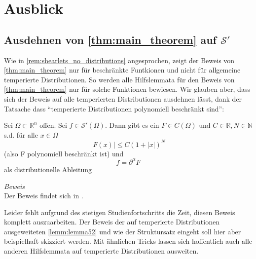 
\section{Ausblick} %
\label{sec:ausblick}

\subsection{\texorpdfstring{Ausdehnen von \cref{thm:main_theorem} auf $\mathcal{S}'$}{Ausdehnen auf Distributionen}} %
\label{sec:ausdehnen_von_thm:main_theorem}
Wie in \cref{rem:shearlets_no_distributions} angesprochen, zeigt der Beweis von \textcite{Kutyniok2008} \cref{thm:main_theorem} nur für beschränkte Funtkionen und nicht für allgemeine temperierte Distributionen. So werden alle Hilfslemmata für den Beweis von \cref{thm:main_theorem} nur für solche Funktionen bewiesen. Wir glauben aber, dass sich der Beweis auf alle temperierten Distributionen ausdehnen lässt, dank der Tatsache dass "`temperierte Distributionen polynomiell beschränkt sind"':

\begin{theorem}
\label{thm:struktursatz}
    Sei $\Omega \subset \mathbb{R}^n$ offen. Sei $f \in \mathcal{S}'(\Omega)$. Dann gibt es ein $F \in C(\Omega)$ und $C \in \mathbb{R}, N \in \mathbb{N}$ s.d. für alle $x \in \Omega$
    \begin{equation*}
        |F(x)| \leq C (1+|x| )^N
    \end{equation*}
    (also F polynomiell beschränkt ist) und
    \begin{equation*}
        f = \partial^\alpha F
    \end{equation*}
    als distributionelle Ableitung

    \emph{Beweis} \\[.3em]
    Der Beweis findet sich in \textcite[S. 97]{Friedlander1998}.
\end{theorem}


Leider fehlt aufgrund des stetigen Studienfortschritts die Zeit, diesen Beweis komplett auszuarbeiten. Der Beweis der auf temperierte Distributionen ausgeweiteten \cref{lemm:lemma52} und wie der Struktursatz eingeht soll hier aber beispielhaft skizziert werden.  Mit ähnlichen Tricks lassen sich hoffentlich auch alle anderen Hilfslemmata auf temperierte Distributionen ausweiten.

